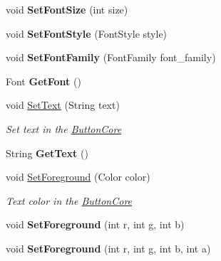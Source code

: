 \begin{DoxyCompactItemize}
void {\bfseries Set\+Font\+Size} (int size)
\item 
\mbox{\label{class_space_v_i_l_1_1_button_core_a3f5de633dc78925402ab2b24fbeb6a9b}} 
void {\bfseries Set\+Font\+Style} (Font\+Style style)
\item 
\mbox{\label{class_space_v_i_l_1_1_button_core_a581128f455f2d7a8b88d7060a670cf07}} 
void {\bfseries Set\+Font\+Family} (Font\+Family font\+\_\+family)
\item 
\mbox{\label{class_space_v_i_l_1_1_button_core_a72b81cdaceb15c8c7e70f623f88ac179}} 
Font {\bfseries Get\+Font} ()
\item 
void \mbox{\hyperlink{class_space_v_i_l_1_1_button_core_a86457a942d46d88f4df249da20fabda4}{Set\+Text}} (String text)
\begin{DoxyCompactList}\small\item\em Set text in the \mbox{\hyperlink{class_space_v_i_l_1_1_button_core}{Button\+Core}} \end{DoxyCompactList}\item 
\mbox{\label{class_space_v_i_l_1_1_button_core_a908f219a802c4ecd793cfe32183fb7f2}} 
String {\bfseries Get\+Text} ()
\item 
void \mbox{\hyperlink{class_space_v_i_l_1_1_button_core_aa9d1ad0d72fc521d412209dd15b5ed54}{Set\+Foreground}} (Color color)
\begin{DoxyCompactList}\small\item\em Text color in the \mbox{\hyperlink{class_space_v_i_l_1_1_button_core}{Button\+Core}} \end{DoxyCompactList}\item 
\mbox{\label{class_space_v_i_l_1_1_button_core_ae92f34995dab81d21aed730912315f86}} 
void {\bfseries Set\+Foreground} (int r, int g, int b)
\item 
\mbox{\label{class_space_v_i_l_1_1_button_core_a730c0574ca870dd768c4baa9504f014d}} 
void {\bfseries Set\+Foreground} (int r, int g, int b, int a)
\item 
\mbox{\label{class_space_v_i_l_1_1_button_core_a44e45145dd36a2cbee376d3efb5eb22c}} 

\end{DoxyCompactItemize}
